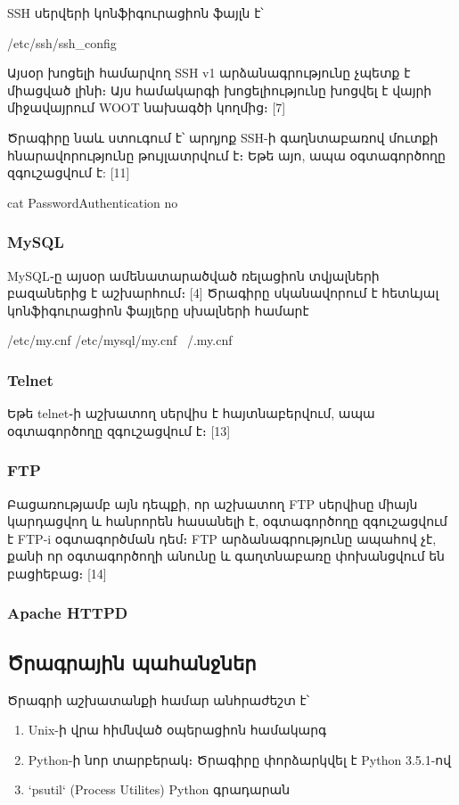 \documentclass[11pt]{article}
\begin{document}
\begin{sloppypar}
SSH սերվերի կոնֆիգուրացիոն ֆայլն է՝

    /etc/ssh/ssh\_config

Այսօր խոցելի համարվող SSH v1 արձանագրությունը չպետք է միացված լինի։
Այս համակարգի խոցելիությունը խոցվել է վայրի միջավայրում WOOT
նախագծի կողմից։ [7]

Ծրագիրը նաև ստուգում է՝ արդյոք SSH-ի գաղնտաբառով մուտքի
հնարավորությունը թույլատրվում է։ Եթե այո, ապա օգտագործողը
զգուշացվում է: [11]

    cat PasswordAuthentication no

\subsubsection{MySQL}

MySQL֊ը այսօր ամենատարածված ռելացիոն տվյալների բազաներից է աշխարհում։ [4]
Ծրագիրը սկանավորում է հետևյալ կոնֆիգուրացիոն ֆայլերը սխալների համարէ

    /etc/my.cnf
    /etc/mysql/my.cnf
    ~/.my.cnf

\subsubsection{Telnet}

Եթե telnet֊ի աշխատող սերվիս է հայտնաբերվում, ապա օգտագործողը զգուշացվում է։
[13]

\subsubsection{FTP}

Բացառությամբ այն դեպքի, որ աշխատող FTP սերվիսը միայն կարդացվող և
հանրորեն հասանելի է, օգտագործողը զգուշացվում է FTP-i օգտագործման դեմ։
FTP արձանագրությունը ապահով չէ, քանի որ օգտագործողի անունը և
գաղտնաբառը փոխանցվում են բացիեբաց։ [14]


\subsubsection{Apache HTTPD}


\subsection{Ծրագրային պահանջներ}

Ծրագրի աշխատանքի համար անհրաժեշտ է՝

\begin{enumerate}
\item Unix-ի վրա հիմնված օպերացիոն համակարգ
\item Python-ի նոր տարբերակ։ Ծրագիրը փորձարկվել է Python 3.5.1-ով
\item `psutil` (Process Utilites) Python գրադարան
\end{enumerate}



\end{sloppypar}
\end{document}
